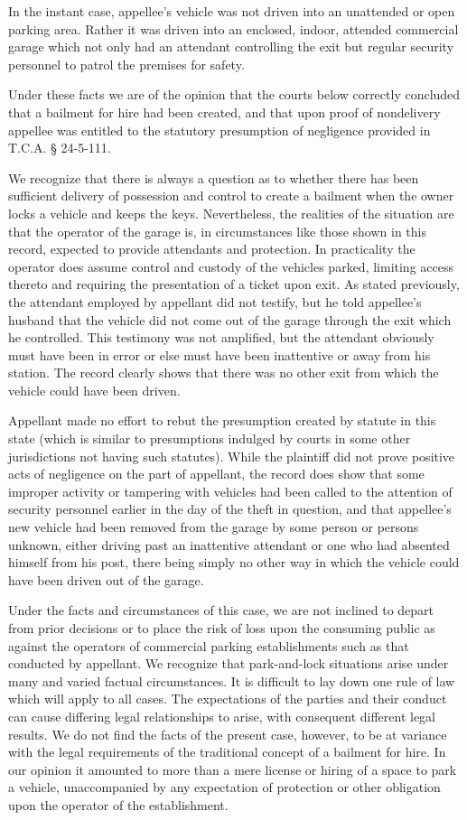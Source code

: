 In the instant case, appellee's vehicle was not driven into an unattended or
open parking area. Rather it was driven into an enclosed, indoor, attended
commercial garage which not only had an attendant controlling the exit but
regular security personnel to patrol the premises for safety.

Under these facts we are of the opinion that the courts below correctly
concluded that a bailment for hire had been created, and that upon proof of
nondelivery appellee was entitled to the statutory presumption of negligence
provided in T.C.A. {\S} 24-5-111.

We recognize that there is always a question as to whether there has been
sufficient delivery of possession and control to create a bailment when the
owner locks a vehicle and keeps the keys. Nevertheless, the realities of the
situation are that the operator of the garage is, in circumstances like those
shown in this record, expected to provide attendants and protection. In
practicality the operator does assume control and custody of the vehicles
parked, limiting access thereto and requiring the presentation of a ticket upon
exit. As stated previously, the attendant employed by appellant did not
testify, but he told appellee's husband that the vehicle did not come out of
the garage through the exit which he controlled. This testimony was not
amplified, but the attendant obviously must have been in error or else must
have been inattentive or away from his station. The record clearly shows that
there was no other exit from which the vehicle could have been driven.

Appellant made no effort to rebut the presumption created by statute in this
state (which is similar to presumptions indulged by courts in some other
jurisdictions not having such statutes). While the plaintiff did not prove
positive acts of negligence on the part of appellant, the record does show that
some improper activity or tampering with vehicles had been called to the
attention of security personnel earlier in the day of the theft in question,
and that appellee's new vehicle had been removed from the garage by some person
or persons unknown, either driving past an inattentive attendant or one who had
absented himself from his post, there being simply no other way in which the
vehicle could have been driven out of the garage.

Under the facts and circumstances of this case, we are not inclined to depart
from prior decisions or to place the risk of loss upon the consuming public as
against the operators of commercial parking establishments such as that
conducted by appellant. We recognize that park-and-lock situations arise under
many and varied factual circumstances. It is difficult to lay down one rule of
law which will apply to all cases. The expectations of the parties and their
conduct can cause differing legal relationships to arise, with consequent
different legal results. We do not find the facts of the present case, however,
to be at variance with the legal requirements of the traditional concept of a
bailment for hire. In our opinion it amounted to more than a mere license or
hiring of a space to park a vehicle, unaccompanied by any expectation of
protection or other obligation upon the operator of the establishment.

